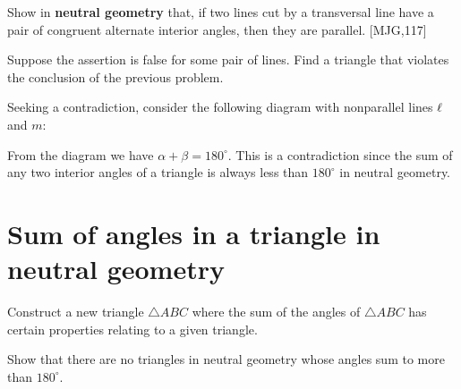 \documentclass[instructornotes]{ximera}
\begin{document}
\begin{problem}\label{ng_parallel}
Show in \textbf{neutral geometry} that, if two lines cut by a transversal line have
a pair of congruent alternate interior angles, then they are
parallel. [MJG,117]

\begin{hint}
Suppose the assertion is false for some pair of lines. Find a triangle
that violates the conclusion of the previous problem.
\end{hint}
\begin{freeResponse}
Seeking a contradiction, consider the following diagram with
nonparallel lines $\ell$ and $m$:
\begin{image}
\end{image}
From the diagram we have $\alpha + \beta = 180^\circ$. This is a
contradiction since the sum of any two interior angles of a triangle
is always less than $180^\circ$ in neutral geometry.
\end{freeResponse}

\end{problem}







\section{Sum of angles in a triangle in neutral geometry}
\begin{listOutcomes}
 \item Construct a new triangle  $\triangle ABC$ where the sum of the angles of  $\triangle ABC$ has certain properties relating to a given triangle.
 \item Show that there are no triangles in neutral geometry whose angles sum to more than $180^\circ$.
\end{listOutcomes}
\end{document}
